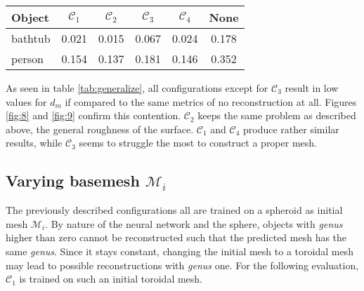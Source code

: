 \begin{center}
     \label{tab:generalize} 
    \begin{center}
        \begin{tabular}{| l  | c | c | c | c || c |}
            \hline
            Object& $\mathcal{C}_1$ & $\mathcal{C}_2$ & $\mathcal{C}_3$ & $\mathcal{C}_4$ & None\\ \hline
            bathtub&0.021&0.015&0.067&0.024 & 0.178\\\hline
            person&0.154&0.137&0.181&0.146 & 0.352\\\hline
        \end{tabular}
    \end{center}
\end{center}

    As seen in table \ref{tab:generalize}, all configurations except for $\mathcal{C}_3$ result in low values for $d_m$ if
    compared to the same metrics of no reconstruction at all. Figures \ref{fig:8} and \ref{fig:9} confirm this contention.
    $\mathcal{C}_2$ keeps the same problem as described above, the general roughness of the surface. $\mathcal{C}_1$ and
    $\mathcal{C}_4$ produce rather similar results, while $\mathcal{C}_3$ seems to struggle the most to construct a proper mesh.

\subsection{Varying basemesh $\mathcal{M}_i$}
    The previously described configurations all are trained on a spheroid as initial mesh $\mathcal{M}_i$. 
    By nature of the neural network and the sphere, objects with \emph{genus} higher than zero cannot be
    reconstructed such that the predicted mesh has the same \emph{genus}. Since it stays constant, 
    changing the initial mesh to a toroidal mesh may lead to possible reconstructions with \emph{genus} one. 
    For the following evaluation, $\mathcal{C}_{1}$ is trained on such an initial toroidal mesh.

